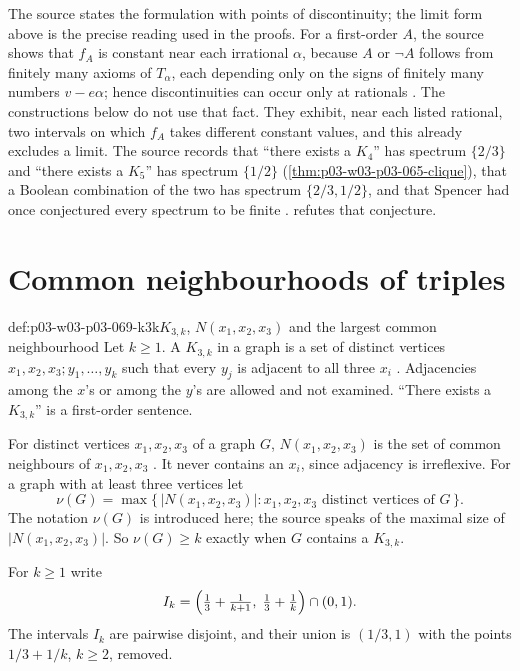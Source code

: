The source states the formulation with points of discontinuity; the
limit form above is the precise reading used in the proofs.  For a
first-order \(A\), the source shows that \(f_A\) is constant near each
irrational \(\alpha\), because \(A\) or \(\neg A\) follows from finitely many
axioms of \(T_\alpha\), each depending only on the signs of finitely many
numbers \(v-e\alpha\); hence discontinuities can occur only at rationals
\cite[p.~15]{Spencer2007LogicRandomStructuresAuthor}.  The constructions below
do not use that fact.  They exhibit, near each listed rational, two
intervals on which \(f_A\) takes different constant values, and this already
excludes a limit.  The source records that ``there exists a \(K_4\)'' has
spectrum \(\{2/3\}\) and ``there exists a \(K_5\)'' has spectrum \(\{1/2\}\)
(\cref{thm:p03-w03-p03-065-clique}), that a Boolean combination of the two has
spectrum \(\{2/3,1/2\}\), and that Spencer had once conjectured every
spectrum to be finite \cite[pp.~15--16]{Spencer2007LogicRandomStructuresAuthor}.
 refutes that conjecture.

\section{Common neighbourhoods of triples}
\label{sec:p03-w03-p03-069-common-neighbourhoods}

\begin{hbdefinition}{def:p03-w03-p03-069-k3k}{\(K_{3,k}\), \(N(x_1,x_2,x_3)\) and the largest common neighbourhood}
Let \(k\geq1\).  A \emph{\(K_{3,k}\)} in a graph is a set of distinct
vertices \(x_1,x_2,x_3;y_1,\ldots,y_k\) such that every \(y_j\) is adjacent
to all three \(x_i\) \cite[p.~16]{Spencer2007LogicRandomStructuresAuthor}.
Adjacencies among the \(x\)'s or among the \(y\)'s are allowed and not
examined.  ``There exists a \(K_{3,k}\)'' is a first-order sentence.

For distinct vertices \(x_1,x_2,x_3\) of a graph \(G\), \(N(x_1,x_2,x_3)\)
is the set of common neighbours of \(x_1,x_2,x_3\)
\cite[p.~16]{Spencer2007LogicRandomStructuresAuthor}.  It never contains an
\(x_i\), since adjacency is irreflexive.  For a graph with at least three
vertices let
\[
  \nu(G)=\max\bigl\{\,|N(x_1,x_2,x_3)| : x_1,x_2,x_3\text{ distinct vertices of }G\,\bigr\}.
\]
The notation \(\nu(G)\) is introduced here; the source speaks of the maximal
size of \(|N(x_1,x_2,x_3)|\).  So \(\nu(G)\geq k\) exactly when \(G\)
contains a \(K_{3,k}\).

For \(k\geq1\) write
\[
  I_k=\Bigl(\tfrac13+\tfrac1{k+1},\;\tfrac13+\tfrac1k\Bigr)\cap(0,1).
\]
The intervals \(I_k\) are pairwise disjoint, and their union is
\((1/3,1)\) with the points \(1/3+1/k\), \(k\geq2\), removed.
\end{hbdefinition}

